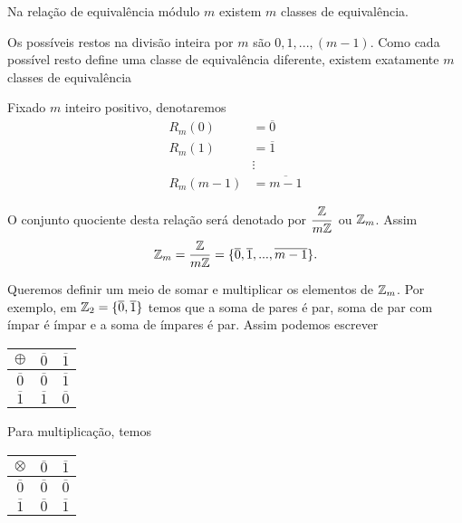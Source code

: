 \begin{proposicao}
    Na relação de equivalência módulo $m$ existem $m$ classes de equivalência.
\end{proposicao}
\begin{prova}
    Os possíveis restos na divisão inteira por $m$ são $0,1,...,(m-1)$. Como cada possível resto define uma classe de equivalência diferente, existem exatamente $m$ classes de equivalência
\end{prova}

\begin{observacao}
Fixado $m$ inteiro positivo, denotaremos
\begin{align*}
    R_{m}(0) &= \overline{0}\\
    R_{m}(1) &= \overline{1}\\
    &\vdots\\
    R_{m}(m-1) &= \overline{m-1}
\end{align*}

O conjunto quociente desta relação ser{á} denotado por $\displaystyle\frac{\mathbb{Z}}{m\mathbb{Z}}$ ou $\mathbb{Z}_m$. Assim
\[
    \mathbb{Z}_m = \displaystyle\frac{\mathbb{Z}}{m\mathbb{Z}}=\{\overline{0},\overline{1},...,\overline{m-1}\}.
\]
\end{observacao}

Queremos definir um meio de somar e multiplicar os elementos de $\mathbb{Z}_m$. Por exemplo, em $\mathbb{Z}_2 = \{\overline{0},\overline{1}\}$ temos que a soma de pares é par, soma de par com ímpar é ímpar e a soma de ímpares é par. Assim podemos escrever

\begin{table}[h]
   \centering
   \setlength{\arrayrulewidth}{0,5\arrayrulewidth}
   \begin{tabular}{|c|c|c|}
      \hline
      $\oplus$ & $\overline{0}$ & $\overline{1}$ \T\\
      \hline
      $\overline{0}$ & $\overline{0}$ & $\overline{1}$\T\\
      \hline
      $\overline{1}$ & $\overline{1}$ & $\overline{0}$\T\\
      \hline
   \end{tabular}
\end{table}

Para multiplicação, temos

\begin{table}[h]
   \centering
   \setlength{\arrayrulewidth}{0,5\arrayrulewidth}
   \begin{tabular}{|c|c|c|}
      \hline
      $\otimes$ & $\overline{0}$ & $\overline{1}$\T\\
      \hline
      $\overline{0}$ & $\overline{0}$ & $\overline{0}$\T\\
      \hline
      $\overline{1}$ & $\overline{0}$ & $\overline{1}$\T\\
      \hline
   \end{tabular}
\end{table}

